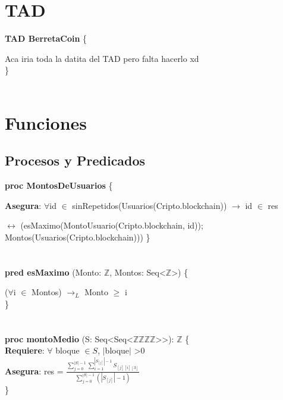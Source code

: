 \documentclass{article}
\begin{document}
\thispagestyle{empty}

\newpage %
\setcounter{page}{1}


\section{TAD}
\textbf{TAD \textdollar BerretaCoin} \{

    Aca iria toda la datita del TAD pero falta hacerlo xd \\
\}\\\\

\section{Funciones}
\subsection{Procesos y Predicados}

\textbf{proc MontosDeUsuarios} \{

    \textbf{Asegura}: $\forall$id $\in$ sinRepetidos(Usuarios(Cripto.blockchain)) $\rightarrow$ id $\in$ res

    $\longleftrightarrow$ (esMaximo(MontoUsuario(Cripto.blockchain, id)); Montos(Usuarios(Cripto.blockchain)))
\}\\\\\\
\textbf{pred esMaximo} (Monto: $\mathds{Z}$, Montos: Seq\textless$\mathds{Z}$\textgreater) \{

    ($\forall$i $\in$ Montos) $\rightarrow_L$ Monto $\geq$ i \\
\}\\\\\\
\textbf{proc montoMedio} (S: Seq\textless Seq\textless$\mathds{Z}$\texttimes$\mathds{Z}$\texttimes$\mathds{Z}$\texttimes$\mathds{Z}$\textgreater\textgreater): $\mathds{Z}$ \{\\

    \textbf{Requiere}: $\forall$ bloque $\in S$, $|$bloque$|$ \textgreater 0 \\

    \textbf{Asegura}: res = $\frac{\sum\limits_{j=0}^{|S|-1} \sum\limits_{i=1}^{|S_{[j]}|-1} S_{[j][i][3]}}{\sum\limits_{j=0}^{|S|-1} (|S_{[j]}|-1)}$ \\
\}\\\\
\end{document}
